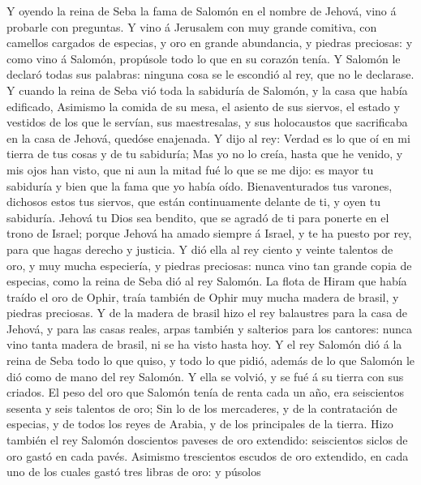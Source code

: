  Y oyendo la reina de Seba la fama de Salomón en el nombre
de Jehová, vino á probarle con preguntas.  Y vino á
Jerusalem con muy grande comitiva, con camellos cargados de especias, y
oro en grande abundancia, y piedras preciosas: y como vino á Salomón,
propúsole todo lo que en su corazón tenía.  Y Salomón le
declaró todas sus palabras: ninguna cosa se le escondió al rey, que no
le declarase.  Y cuando la reina de Seba vió toda la
sabiduría de Salomón, y la casa que había edificado, 
Asimismo la comida de su mesa, el asiento de sus siervos, el estado y
vestidos de los que le servían, sus maestresalas, y sus holocaustos que
sacrificaba en la casa de Jehová, quedóse enajenada.  Y
dijo al rey: Verdad es lo que oí en mi tierra de tus cosas y de tu
sabiduría;  Mas yo no lo creía, hasta que he venido, y mis
ojos han visto, que ni aun la mitad fué lo que se me dijo: es mayor tu
sabiduría y bien que la fama que yo había oído. 
Bienaventurados tus varones, dichosos estos tus siervos, que están
continuamente delante de ti, y oyen tu sabiduría.  Jehová
tu Dios sea bendito, que se agradó de ti para ponerte en el trono de
Israel; porque Jehová ha amado siempre á Israel, y te ha puesto por rey,
para que hagas derecho y justicia.  Y dió ella al rey
ciento y veinte talentos de oro, y muy mucha especiería, y piedras
preciosas: nunca vino tan grande copia de especias, como la reina de
Seba dió al rey Salomón.  La flota de Hiram que había
traído el oro de Ophir, traía también de Ophir muy mucha madera de
brasil, y piedras preciosas.  Y de la madera de brasil
hizo el rey balaustres para la casa de Jehová, y para las casas reales,
arpas también y salterios para los cantores: nunca vino tanta madera de
brasil, ni se ha visto hasta hoy.  Y el rey Salomón dió á
la reina de Seba todo lo que quiso, y todo lo que pidió, además de lo
que Salomón le dió como de mano del rey Salomón. Y ella se volvió, y se
fué á su tierra con sus criados.  El peso del oro que
Salomón tenía de renta cada un año, era seiscientos sesenta y seis
talentos de oro;  Sin lo de los mercaderes, y de la
contratación de especias, y de todos los reyes de Arabia, y de los
principales de la tierra.  Hizo también el rey Salomón
doscientos paveses de oro extendido: seiscientos siclos de oro gastó en
cada pavés.  Asimismo trescientos escudos de oro
extendido, en cada uno de los cuales gastó tres libras de oro: y púsolos
